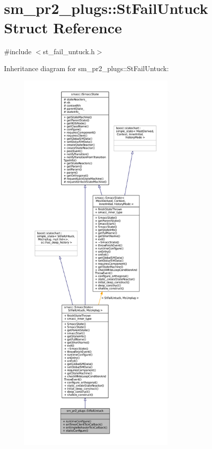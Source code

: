 \hypertarget{structsm__pr2__plugs_1_1StFailUntuck}{}\section{sm\+\_\+pr2\+\_\+plugs\+:\+:St\+Fail\+Untuck Struct Reference}
\label{structsm__pr2__plugs_1_1StFailUntuck}


{\ttfamily \#include $<$st\+\_\+fail\+\_\+untuck.\+h$>$}



Inheritance diagram for sm\+\_\+pr2\+\_\+plugs\+:\+:St\+Fail\+Untuck\+:
\nopagebreak
\begin{figure}[H]
\begin{center}
\leavevmode
\includegraphics[height=550pt]{structsm__pr2__plugs_1_1StFailUntuck__inherit__graph}
\end{center}
\end{figure}


